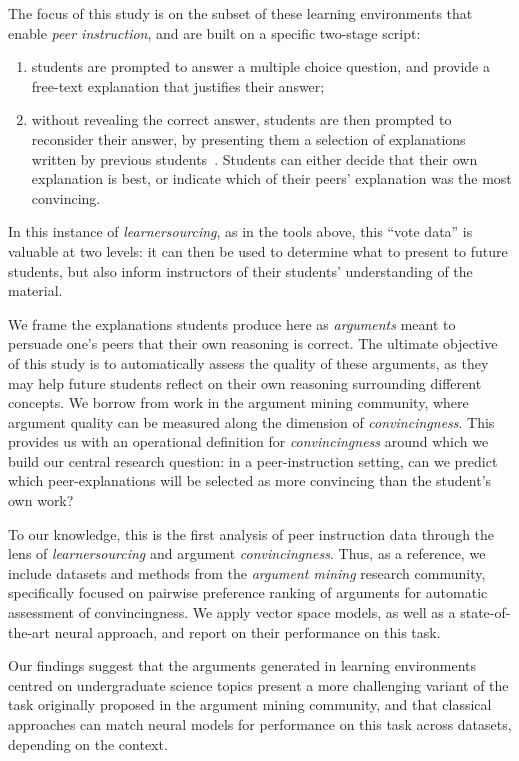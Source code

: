 \documentclass[runningheads]{llncs}
\begin{document}
The focus of this study is on the subset of these learning 
environments that enable \textit{peer instruction}\cite{crouch_peer_2001}, and 
are built on a specific two-stage script: 
\begin{enumerate}
	\item students are prompted to answer a multiple choice question, and 
	provide a free-text explanation that justifies their answer;
	\item without revealing the correct answer, students are then prompted to 
	reconsider their answer, by presenting them a selection of explanations 
	written by previous students~\cite{bhatnagar_dalite:_2016}.
	Students can either decide that their own explanation is best, or indicate 
	which of their peers' explanation was the most convincing.
\end{enumerate}
In this instance of \textit{learnersourcing}, as in the tools above, this 
``vote data'' is valuable at two levels: it can then be used to determine what 
to present to future students, but also inform instructors of their students' 
understanding of the material.

We frame the explanations students produce here as \textit{arguments} 
meant to persuade one's peers that their own reasoning is correct.
The ultimate objective of this study is to automatically assess the quality of 
these arguments, as they may help future students reflect on their own 
reasoning surrounding different concepts.
We borrow from work in the argument mining community, where argument quality 
can be measured along the dimension of \textit{convincingness}. 
This provides us with an operational definition for \textit{convincingness} 
around which we build our central research question: in a peer-instruction 
setting, can we predict which peer-explanations will be selected as more 
convincing than the student's own work? 

To our knowledge, this is the first analysis of peer instruction data through 
the lens of \textit{learnersourcing} and argument \textit{convincingness}.
Thus, as a reference, we include datasets and methods from the \textit{argument 
mining} research community, specifically focused on pairwise preference ranking 
of arguments for automatic assessment of convincingness.
We apply vector space models, as well as a state-of-the-art neural approach, 
and report on their performance on this task.

Our findings suggest that the arguments generated in learning environments 
centred on undergraduate science topics present a more challenging variant of 
the task originally proposed in the argument mining community, and that 
classical approaches can match neural models for performance on this task 
across datasets, depending on the context.
\end{document}
